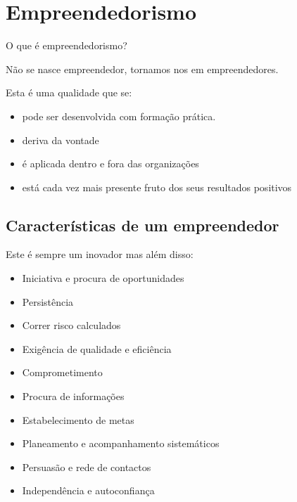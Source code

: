 
\section{Empreendedorismo}

O que é empreendedorismo?

Não se nasce empreendedor, tornamos nos em empreendedores.

Esta é uma qualidade que se:
\begin{itemize}
      \item pode ser desenvolvida com formação prática.
      \item deriva da vontade
      \item é aplicada dentro e fora das organizações
      \item está cada vez mais presente fruto dos seus resultados positivos
\end{itemize}



\newpage
\subsection{Características de um empreendedor}


Este é sempre um inovador mas além disso:
\begin{itemize}
      \item Iniciativa e procura de oportunidades
      \item Persistência
      \item Correr risco calculados
      \item Exigência de qualidade e eficiência
      \item Comprometimento


      \item Procura de informações
      \item Estabelecimento de metas
      \item Planeamento e acompanhamento sistemáticos
      
      
      \item Persuasão e rede de contactos
      

      \item Independência e autoconfiança
\end{itemize}



